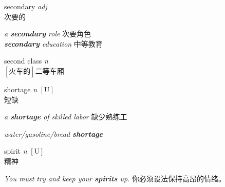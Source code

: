 \item[] {
    \lettrine{secondary}{}  
    \textit{adj} \\
    次要的
    
    \textit{a \textbf{secondary} role} 次要角色\\
    \textit{\textbf{secondary} education} 中等教育
} 

\item[] {
    \lettrine{\textsecstress second \textprimstress class}{}  
    \textit{n} \\
    $\mathrm{[\mbox{火车的}]}$二等车厢
    
} 

\item[] {
    \lettrine{shortage}{}  
    \textit{n} 
    $\mathrm{[U]}$ 
    \\
    短缺

    \textit{a \textbf{shortage} of skilled labor}
    缺少熟练工

    \textit{water/gasoline/bread \textbf{shortage}}

}

\item[] {
    \lettrine{spirit}{}  
    \textit{n} 
    $\mathrm{[U]}$ 
    \\
    精神

    \textit{You must try and keep your \textbf{spirits} up.}
    你必须设法保持高昂的情绪。

}